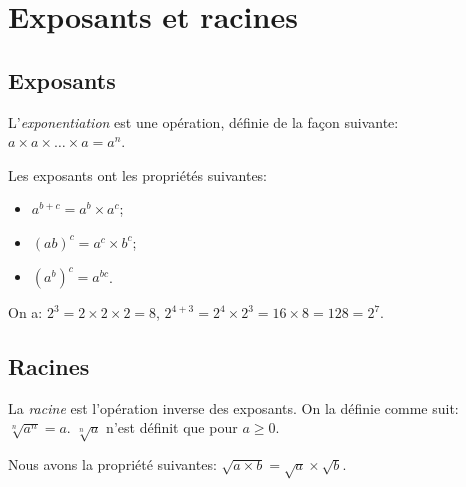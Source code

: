 \section{Exposants et racines}

\subsection{Exposants}\label{exposants}

\begin{definitionfr}
    L'\emph{exponentiation} est une opération, définie de la façon suivante: $a \times a \times \dots \times a = a^n$.
\end{definitionfr}

\begin{propriete}
    Les exposants ont les propriétés suivantes:
    \begin{itemize}
        \item $a^{b+c} = a^b \times a^c$;
        \item $(ab)^c = a^c \times b^c$;
        \item $(a^b)^c = a^{bc}$.
    \end{itemize}
\end{propriete}

\begin{exemple}
    On a: $2^3 = 2\times 2\times 2 = 8$, $2^{4 + 3} = 2^4 \times 2^3 = 16 \times 8 = 128 = 2^7$.
\end{exemple}

\subsection{Racines}

\begin{definitionfr}
    La \emph{racine} est l'opération inverse des exposants. On la définie comme suit: $\sqrt[n]{a^n} = a$. $\sqrt[n]{a}$ n'est définit que pour $a\geq 0$.
\end{definitionfr}

\begin{propriete}
    Nous avons la propriété suivantes: $\sqrt{a\times b} = \sqrt{a} \times \sqrt{b}$.
\end{propriete}